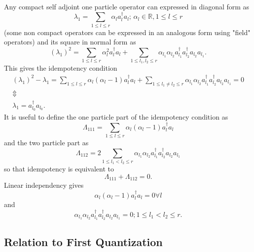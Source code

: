 \documentclass[aps,preprint]{revtex4}%
\begin{document}
Any compact self adjoint one particle operator can expressed in diagonal form
as
\begin{equation}
\lambda_{1}=\sum_{1\leq l\leq r}\alpha_{l}a_{l}^{\dagger}a_{l};\,\alpha_{l}%
\in\mathbb{R},1\leq l\leq r
\end{equation}
(some non compact operators can be expressed in an analogous form using
"field" operators) and its square in normal form as
\begin{equation}
\left(  \lambda_{1}\right)  ^{2}=\sum_{1\leq l\leq r}\alpha_{l}^{2}%
a_{l}^{\dagger}a_{l}+\sum_{1\leq l_{1},l_{2}\leq r}\alpha_{l_{1}}\alpha
_{l_{2}}a_{l_{1}}^{\dagger}a_{l_{2}}^{\dagger}a_{l_{2}}a_{l_{1}}.
\end{equation}
This gives the idempotency condition
\begin{gather}
\left(  \lambda_{1}\right)  ^{2}-\lambda_{1}=\sum_{1\leq l\leq r}\alpha
_{l}\left(  \alpha_{l}-1\right)  a_{l}^{\dagger}a_{l}+\sum_{1\leq l_{1}\neq
l_{2}\leq r}\alpha_{l_{1}}\alpha_{l_{2}}a_{l_{1}}^{\dagger}a_{l_{2}}^{\dagger
}a_{l_{2}}a_{l_{1}}=0\nonumber\\
\Updownarrow\nonumber\\
\lambda_{1}=a_{l_{0}}^{\dagger}a_{l_{0}}.
\end{gather}
It is useful to define the one particle part of the idempotency condition as
\begin{equation}
\Lambda_{111}=\sum_{1\leq l\leq r}\alpha_{l}\left(  \alpha_{l}-1\right)
a_{l}^{\dagger}a_{l}%
\end{equation}
and the two particle part as
\begin{equation}
\Lambda_{112}=2\sum_{1\leq l_{1}<l_{2}\leq r}\alpha_{l_{1}}\alpha_{l_{2}%
}a_{l_{1}}^{\dagger}a_{l_{2}}^{\dagger}a_{l_{2}}a_{l_{1}}%
\end{equation}
so that idempotency is equivalent to
\begin{equation}
\Lambda_{111}+\Lambda_{112}=0.
\end{equation}
Linear independency gives
\begin{equation}
\alpha_{l}\left(  \alpha_{l}-1\right)  a_{l}^{\dagger}a_{l}=0\forall l
\end{equation}
and
\begin{equation}
\alpha_{l_{1}}\alpha_{l_{2}}a_{l_{1}}^{\dagger}a_{l_{2}}^{\dagger}a_{l_{2}%
}a_{l_{1}}=0;1\leq l_{1}<l_{2}\leq r.
\end{equation}


\subsection{Relation to First Quantization}
\end{document}

